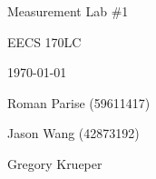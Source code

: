 \centering
\vspace{2.5cm}
{\huge Measurement Lab \#1 \par}
{\Large EECS 170LC \par}
{\Large \today \par}
\vspace{1cm}
{\large Roman Parise (59611417) \par}
{\large Jason Wang (42873192) \par}
{\large Gregory Krueper \par}
\vspace{1cm}
